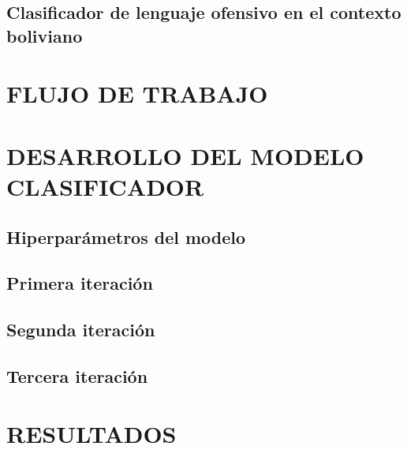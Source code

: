 \subsection{Clasificador de lenguaje ofensivo en el contexto boliviano}

\section{FLUJO DE TRABAJO}

\section{DESARROLLO DEL MODELO CLASIFICADOR}

\subsection{Hiperparámetros del modelo}

\subsection{Primera iteración}

\subsection{Segunda iteración}

%
\subsection{Tercera iteración}

\section{RESULTADOS}


